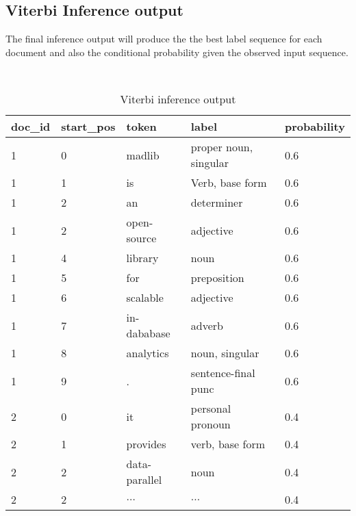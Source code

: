 \subsection{Viterbi Inference output}
The final inference output will produce the the best label sequence for each document and also the conditional probability given the
observed input sequence.
\begin {table}[h]
\caption {Viterbi inference output} 
\begin{center}
    \scriptsize\tt
    \begin{tabular}{ | l | l | l | l | l | }
    \hline
    doc\_id & start\_pos & token & label & probability     \\\hline
    1   & 0    & madlib        & proper noun, singular &0.6\\ 
    1   & 1    & is            & Verb, base form       &0.6 \\
    1   & 2    & an            & determiner            &0.6 \\ 
    1   & 2    & open-source   & adjective             &0.6 \\
    1   & 4    & library       & noun                  &0.6 \\
    1   & 5    & for           & preposition           &0.6 \\
    1   & 6    & scalable      & adjective             &0.6 \\
    1   & 7    & in-dababase   & adverb                &0.6 \\
    1   & 8    & analytics     & noun, singular        &0.6 \\
    1   & 9    & .             & sentence-final punc   &0.6 \\
    2   & 0    & it            & personal pronoun      &0.4 \\ 
    2   & 1    & provides      & verb, base form       &0.4 \\
    2   & 2    & data-parallel & noun                  &0.4 \\
    2   & 2    & $\ldots$      & $\ldots$                    &0.4 \\
    \hline
    \end{tabular}
\end{center}
\end{table}
